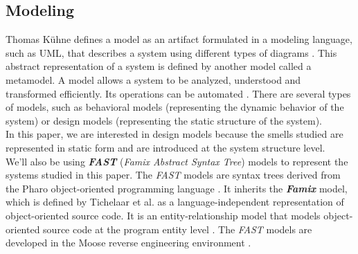 


\subsection{Modeling}

Thomas Kühne defines a model as an artifact formulated in a modeling language, such as UML, that describes a system using different types of diagrams \cite{kuhne2006matters}. This abstract representation of a system is defined by another model called a metamodel. A model allows a system to be analyzed, understood and transformed efficiently. Its operations can be automated \cite{gonzalez2014formal}. There are several types of models, such as behavioral models (representing the dynamic behavior of the system) or design models (representing the static structure of the system).\\In this paper, we are interested in design models because the smells studied are represented in static form and are introduced at the system structure level.\\

We'll also be using \textbf{\emph{FAST}} (\emph{Famix Abstract Syntax Tree})
models to represent the systems studied in this paper. The \emph{FAST} models
are syntax trees derived from the Pharo object-oriented programming language
\cite{black2010pharo, bergel2013deep, zaitsev2020characterizing}. It inherits
the \textbf{\emph{Famix}} model, which is defined by Tichelaar et al. as a
language-independent representation of object-oriented source code. It is an
entity-relationship model that models object-oriented source code at the program
entity level \cite{891485} \cite{demeyer1999famix}. The \emph{FAST} models are
developed in the Moose reverse engineering environment
\cite{ducasse2000moose}.\\\\



